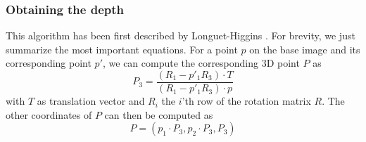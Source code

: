 \documentclass{paper}
\begin{document}
\subsubsection{Obtaining the depth}
This algorithm has been first described by Longuet-Higgins \cite{Longuet-Higgins87}. For brevity, we just summarize the most important equations. For
a point $p$ on the base image and its corresponding point $p'$, we can compute the corresponding 3D point $P$ as
\begin{equation}
 P_3 = \frac{(R_1 - p'_1 R_3) \cdot T}{(R_1 - p'_1 R_3) \cdot p}
\end{equation}
with $T$ as translation vector and $R_i$ the $i$'th row of the rotation matrix $R$. The other coordinates of $P$ can then be computed as
\begin{equation}
 P = (p_1 \cdot P_3, p_2 \cdot P_3, P_3)
\end{equation}
\end{document}
